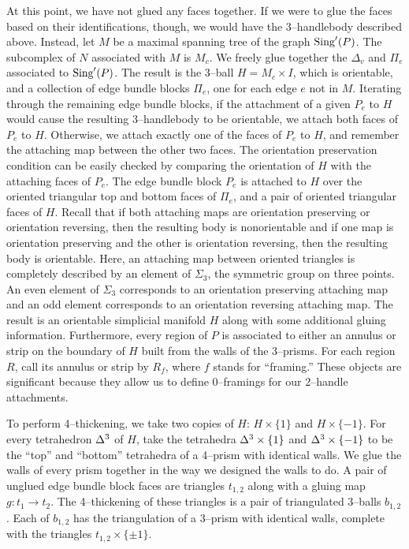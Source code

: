At this point, we have not glued any faces together.
If we were to glue the faces based on their identifications, though, we would have the 3--handlebody described above.
Instead, let $M$ be a maximal spanning tree of the graph $\textrm{Sing}'(P)$.
The subcomplex of $N$ associated with $M$ is $M_c$.
We freely glue together the $\Delta_v$ and $\Pi_e$ associated to $\textrm{Sing}'(P)$.
The result is the 3--ball $H=M_c\times I$, which is orientable, and a collection of edge bundle blocks $\Pi_e$, one for each edge $e$ not in $M$.
Iterating through the remaining edge bundle blocks, if the attachment of a given $P_e$ to $H$ would cause the resulting 3--handlebody to be orientable, we attach both faces of $P_e$ to $H$.
Otherwise, we attach exactly one of the faces of $P_e$ to $H$, and remember the attaching map between the other two faces.
The orientation preservation condition can be easily checked by comparing the orientation of $H$ with the attaching faces of $P_e$.
The edge bundle block $P_e$ is attached to $H$ over the oriented triangular top and bottom faces of $\Pi_e$, and a pair of oriented triangular faces of $H$.
Recall that if both attaching maps are orientation preserving or orientation reversing, then the resulting body is nonorientable and if one map is orientation preserving and the other is orientation reversing, then the resulting body is orientable.
Here, an attaching map between oriented triangles is completely described by an element of $\Sigma_3$, the symmetric group on three points.
An even element of $\Sigma_3$ corresponds to an orientation preserving attaching map and an odd element corresponds to an orientation reversing attaching map.
The result is an orientable simplicial manifold $H$ along with some additional gluing information.
Furthermore, every region of $P$ is associated to either an annulus or strip on the boundary of $H$ built from the walls of the 3--prisms.
For each region $R$, call its annulus or strip by $R_f$, where $f$ stands for ``framing.''
These objects are significant because they allow us to define 0--framings for our 2--handle attachments.

To perform 4--thickening, we take two copies of $H$: $H\times\{1\}$ and $H\times \{-1\}$.
For every tetrahedron $\Delta^3$ of $H$, take the tetrahedra $\Delta^3\times\{1\}$ and $\Delta^3\times\{-1\}$ to be the ``top'' and ``bottom'' tetrahedra of a 4--prism with identical walls.
We glue the walls of every prism together in the way we designed the walls to do.
A pair of unglued edge bundle block faces are triangles $t_{1,2}$ along with a gluing map $g:t_1\to t_2$.
The 4--thickening of these triangles is a pair of triangulated 3--balls $b_{1,2}$.
Each of $b_{1,2}$ has the triangulation of a 3--prism with identical walls, complete with the triangles $t_{1,2}\times\{\pm 1\}$.


